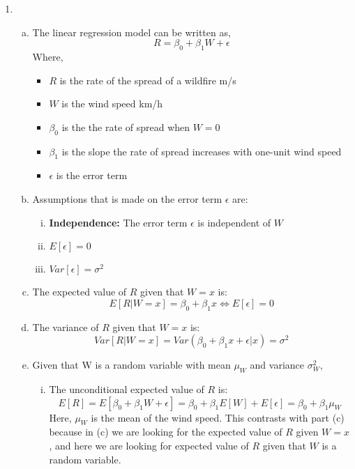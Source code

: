 \documentclass[12pt]{article}
\begin{document}
\begin{enumerate}[1.]
        \item 
        \begin{enumerate}[(a)]
            \item The linear regression model can be written as,
            \[ R = \beta_0 + \beta_1 W + \epsilon\]
            Where,
            \begin{itemize}
                \item $R$ is the rate of the spread of a wildfire m/s
                \item $W$ is the wind speed km/h
                \item $\beta_0$ is the the rate of spread when $W = 0$
                \item $\beta_1$ is the slope the rate of spread increases with one-unit wind speed
                \item $\epsilon$ is the error term
            \end{itemize}
            \item Assumptions that is made on the error term $\epsilon$ are:
            \begin{enumerate}[i.]
            \item \textbf{Independence:} The error term $\epsilon$ is independent of $W$
            \item $E[\epsilon] = 0$
            \item $Var[\epsilon] = \sigma^2$
            \end{enumerate}
            \item The expected value of $R$ given that $W = x$ is:
            \[ E[R|W = x] = \beta_0 + \beta_1 x \Leftrightarrow E[\epsilon] = 0\]
            \item The variance of $R$ given that $W = x$ is:
            \[ Var[R|W = x] = Var(\beta_0 + \beta_1 x + \epsilon|x) = \sigma^2 \]
            \item Given that W is a random variable with mean $\mu_W$ and variance $\sigma_W^2$,
            \begin{enumerate}[i.]
                \item The unconditional expected value of $R$ is:
                \[ E[R] =  E[\beta_0 + \beta_1 W + \epsilon] = \beta_0 + \beta_1 E[W] + E[\epsilon] = \beta_0 + \beta_1 \mu_W \]
                Here, $\mu_W$ is the mean of the wind speed. This contrasts with part (c) because in (c) we are looking for the expected value of
                $R$ given $W = x$, and here we are looking for expected value of $R$ given that $W$ is a random variable.

\end{enumerate}
\end{enumerate}
\end{enumerate}
\end{document}

